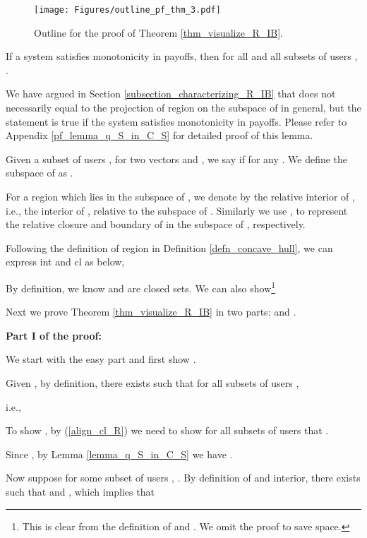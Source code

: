 \documentclass[prodmode,acmtompecs]{acmsmall}
\begin{document}
\begin{figure}[htp]
  \centering
  \texttt{[image: Figures/outline\_pf\_thm\_3.pdf]}
  \caption{Outline for the proof of Theorem \ref{thm_visualize_R_IB}. }
  \label{fig_outline_pf_thm_3}
\end{figure}

\begin{lemma}
\label{lemma_q_S_in_C_S}
If a system satisfies monotonicity in payoffs, then for all  and all subsets of users , . 
\end{lemma}

We have argued in Section \ref{subsection_characterizing_R_IB} that  does not necessarily equal to the projection of region  on the subspace of  in general, but the statement is true if the system satisfies monotonicity in payoffs. Please refer to Appendix \ref{pf_lemma_q_S_in_C_S} for detailed proof of this lemma. 

Given a subset of users , for two vectors  and , we say  if  for any . 
We define the subspace of  as . 

For a region  which lies in the subspace of , we denote by  the relative interior of , i.e., the interior of , relative to the subspace of . 
Similarly we use ,  to represent the relative closure and boundary of  in the subspace of , respectively. 

Following the definition of region  in Definition \ref{defn_concave_hull}, we can express int and cl as below, 

By definition, we know  and  are closed sets. We can also show\footnote{This is clear from the definition of  and . We omit the proof to save space. }


Next we prove Theorem \ref{thm_visualize_R_IB} in two parts:  and . 

{\bf Part I of the proof: }

We start with the easy part and first show .

Given , by definition, there exists  such that for all subsets of users , 

i.e., 




To show , by (\ref{align_cl_R}) we need to show for all subsets of users  that . 

Since , by Lemma \ref{lemma_q_S_in_C_S} we have . 

Now suppose for some subset of users , . By definition of  and interior, there exists  such that  and , which implies that


\newcommand*{\cvxCombPar}{c}
\end{document}
